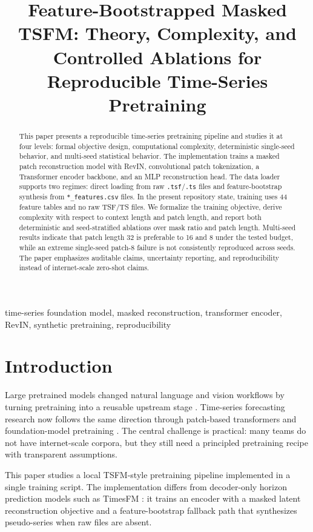 \documentclass[conference]{IEEEtran}
\title{Feature-Bootstrapped Masked TSFM: Theory, Complexity, and Controlled Ablations for Reproducible Time-Series Pretraining}
\author{\IEEEauthorblockN{Vishn}}
\begin{document}
\maketitle

\begin{abstract}
This paper presents a reproducible time-series pretraining pipeline and studies it at four levels: formal objective design, computational complexity, deterministic single-seed behavior, and multi-seed statistical behavior. The implementation trains a masked patch reconstruction model with RevIN, convolutional patch tokenization, a Transformer encoder backbone, and an MLP reconstruction head. The data loader supports two regimes: direct loading from raw \texttt{.tsf}/\texttt{.ts} files and feature-bootstrap synthesis from \texttt{*\_features.csv} files. In the present repository state, training uses 44 feature tables and no raw TSF/TS files. We formalize the training objective, derive complexity with respect to context length and patch length, and report both deterministic and seed-stratified ablations over mask ratio and patch length. Multi-seed results indicate that patch length 32 is preferable to 16 and 8 under the tested budget, while an extreme single-seed patch-8 failure is not consistently reproduced across seeds. The paper emphasizes auditable claims, uncertainty reporting, and reproducibility instead of internet-scale zero-shot claims.
\end{abstract}

\begin{IEEEkeywords}
time-series foundation model, masked reconstruction, transformer encoder, RevIN, synthetic pretraining, reproducibility
\end{IEEEkeywords}

\section{Introduction}
Large pretrained models changed natural language and vision workflows by turning pretraining into a reusable upstream stage \cite{brown2020gpt3,devlin2019bert,dosovitskiy2021vit,he2022mae}. Time-series forecasting research now follows the same direction through patch-based transformers and foundation-model pretraining \cite{timesfm,patchtst,informer,autoformer,fedformer}. The central challenge is practical: many teams do not have internet-scale corpora, but they still need a principled pretraining recipe with transparent assumptions.

This paper studies a local TSFM-style pretraining pipeline implemented in a single training script. The implementation differs from decoder-only horizon prediction models such as TimesFM \cite{timesfm}: it trains an encoder with a masked latent reconstruction objective and a feature-bootstrap fallback path that synthesizes pseudo-series when raw files are absent.
\end{document}
